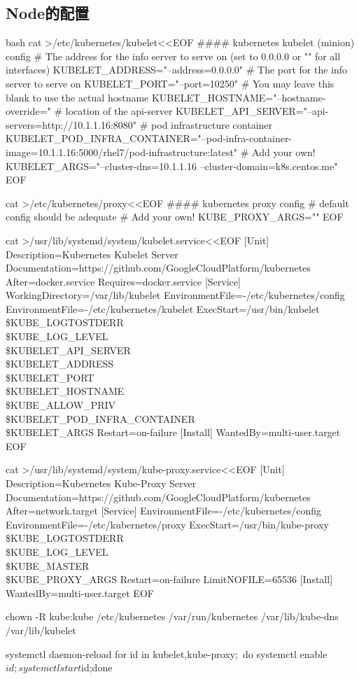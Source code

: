 \subsection{Node的配置}
\begin{code-block}{bash}
cat >/etc/kubernetes/kubelet<<EOF
#### kubernetes kubelet (minion) config
# The address for the info server to serve on (set to 0.0.0.0 or "" for all interfaces)
KUBELET_ADDRESS="--address=0.0.0.0"
# The port for the info server to serve on
KUBELET_PORT="--port=10250"
# You may leave this blank to use the actual hostname
KUBELET_HOSTNAME="--hostname-override="
# location of the api-server
KUBELET_API_SERVER="--api-servers=http://10.1.1.16:8080"
# pod infrastructure container
KUBELET_POD_INFRA_CONTAINER="--pod-infra-container-image=10.1.1.16:5000/rhel7/pod-infrastructure:latest"
# Add your own!
KUBELET_ARGS="--cluster-dns=10.1.1.16 --cluster-domain=k8s.centos.me"
EOF

cat >/etc/kubernetes/proxy<<EOF
#### kubernetes proxy config
# default config should be adequate
# Add your own!
KUBE_PROXY_ARGS=""
EOF

cat >/usr/lib/systemd/system/kubelet.service<<EOF
[Unit]
Description=Kubernetes Kubelet Server
Documentation=https://github.com/GoogleCloudPlatform/kubernetes
After=docker.service
Requires=docker.service
[Service]
WorkingDirectory=/var/lib/kubelet
EnvironmentFile=-/etc/kubernetes/config
EnvironmentFile=-/etc/kubernetes/kubelet
ExecStart=/usr/bin/kubelet \\
            \$KUBE_LOGTOSTDERR \\
            \$KUBE_LOG_LEVEL \\
            \$KUBELET_API_SERVER \\
            \$KUBELET_ADDRESS \\
            \$KUBELET_PORT \\
            \$KUBELET_HOSTNAME \\
            \$KUBE_ALLOW_PRIV \\
            \$KUBELET_POD_INFRA_CONTAINER \\
            \$KUBELET_ARGS
Restart=on-failure
[Install]
WantedBy=multi-user.target
EOF

cat >/usr/lib/systemd/system/kube-proxy.service<<EOF
[Unit]
Description=Kubernetes Kube-Proxy Server
Documentation=https://github.com/GoogleCloudPlatform/kubernetes
After=network.target
[Service]
EnvironmentFile=-/etc/kubernetes/config
EnvironmentFile=-/etc/kubernetes/proxy
ExecStart=/usr/bin/kube-proxy \\
            \$KUBE_LOGTOSTDERR \\
            \$KUBE_LOG_LEVEL \\
            \$KUBE_MASTER \\
            \$KUBE_PROXY_ARGS
Restart=on-failure
LimitNOFILE=65536
[Install]
WantedBy=multi-user.target
EOF

chown -R kube:kube /etc/kubernetes /var/run/kubernetes /var/lib/kube-dns /var/lib/kubelet

systemctl daemon-reload
for id in {kubelet,kube-proxy};\
    do systemctl enable $id;systemctl start $id;done
\end{code-block}


